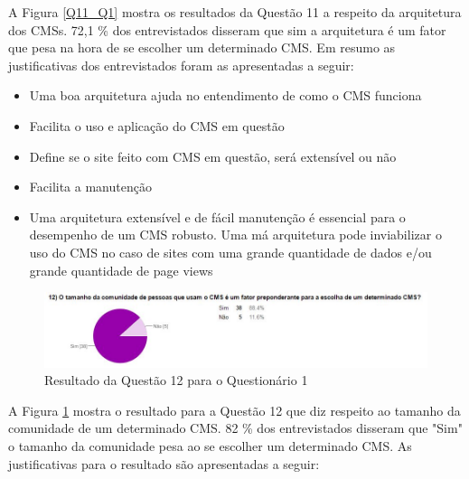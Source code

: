 A Figura \ref{Q11_Q1} mostra os resultados da Questão 11 a respeito da arquitetura dos CMSs. 72,1 \% dos entrevistados disseram que sim a arquitetura é um fator que pesa na hora de se escolher um determinado CMS. Em resumo as justificativas dos entrevistados foram as apresentadas a seguir: 

\begin{itemize}
\item Uma boa arquitetura ajuda no entendimento de como o CMS funciona
\item Facilita o uso e aplicação do CMS em questão
\item Define se o site feito com CMS em questão, será extensível ou não
\item Facilita a manutenção 
\item Uma arquitetura extensível e de fácil manutenção é essencial para o desempenho de um CMS robusto. Uma má arquitetura pode inviabilizar o uso do CMS no caso de sites com uma grande quantidade de dados e/ou grande quantidade de page views

\end{itemize}



\begin{figure}[th]
\centering
\includegraphics[keepaspectratio=true,scale=0.7]{figuras/Ques_1/q12.jpg}
\caption{Resultado da Questão 12 para o Questionário 1}
\label{Q12_Q1}
\end{figure}
A Figura \ref{Q12_Q1} mostra o resultado para a Questão 12 que diz respeito ao tamanho da comunidade de um determinado CMS. 82 \% dos entrevistados disseram que "Sim" o tamanho da comunidade pesa ao se escolher um determinado CMS. As justificativas para o resultado são apresentadas a seguir:

